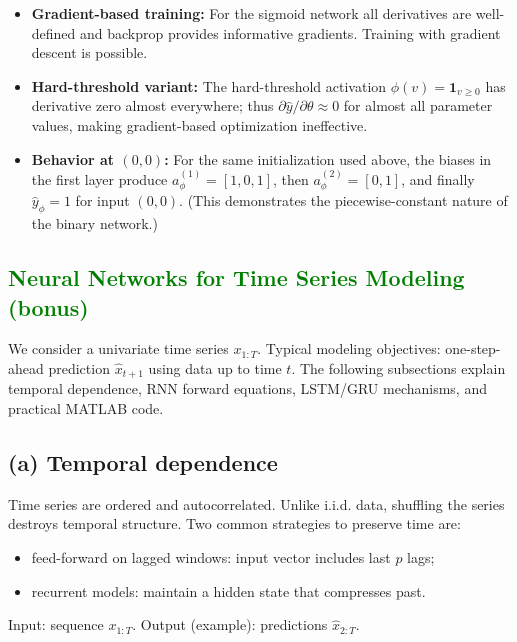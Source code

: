 \documentclass[11pt,a4paper]{article}
\begin{document}
\begin{itemize}
  \item \textbf{Gradient-based training:} For the sigmoid network all derivatives
        are well-defined and backprop provides informative gradients. Training
        with gradient descent is possible.
  \item \textbf{Hard-threshold variant:} The hard-threshold activation
        $\phi(v)=\mathbf{1}_{v\ge 0}$ has derivative zero almost everywhere; thus
        $\partial \hat{y}/\partial\theta \approx 0$ for almost all parameter
        values, making gradient-based optimization ineffective.
  \item \textbf{Behavior at $(0,0)$:} For the same initialization used above,
        the biases in the first layer produce $a^{(1)}_\phi=[1,0,1]$, then
        $a^{(2)}_\phi=[0,1]$, and finally $\hat y_\phi = 1$ for input $(0,0)$.
        (This demonstrates the piecewise-constant nature of the binary network.)
\end{itemize}









\subsection{\textcolor{green}{Neural Networks for Time Series Modeling (bonus)}}

We consider a univariate time series \(x_{1:T}\). Typical modeling objectives:
one-step-ahead prediction \(\hat{x}_{t+1}\) using data up to time \(t\). The
following subsections explain temporal dependence, RNN forward equations,
LSTM/GRU mechanisms, and practical MATLAB code.

\subsection*{(a) Temporal dependence}
Time series are ordered and autocorrelated. Unlike i.i.d. data, shuffling
the series destroys temporal structure. Two common strategies to preserve
time are:
\begin{itemize}
  \item feed-forward on lagged windows: input vector includes last \(p\) lags;
  \item recurrent models: maintain a hidden state that compresses past.
\end{itemize}
Input: sequence \(x_{1:T}\). Output (example): predictions \(\hat{x}_{2:T}\).
\end{document}
